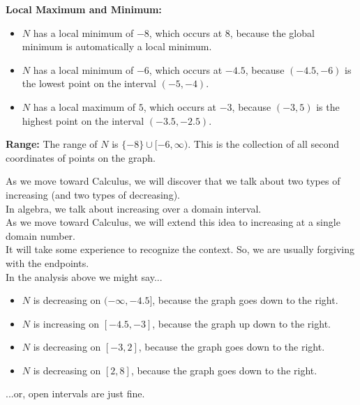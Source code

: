\documentclass{ximera}
\begin{document}
\begin{example}
\textbf{Local Maximum and Minimum:} 

\begin{itemize}
     \item $N$ has a local minimum of $-8$, which occurs at $8$, because the global minimum is automatically a local minimum.
     \item $N$ has a local minimum of $-6$, which occurs at $-4.5$, because $(-4.5, -6)$ is the lowest point on the interval $(-5, -4)$.
     \item $N$ has a local maximum of $5$, which occurs at $-3$, because $(-3, 5)$ is the highest point on the interval $(-3.5, -2.5)$.

\end{itemize}

\textbf{Range:} The range of $N$ is $\{ -8 \} \cup [-6, \infty)$. This is the collection of all second coordinates of points on the graph.\\ 


\end{example}



\begin{observation}

As we move toward Calculus, we will discover that we talk about two types of increasing (and two types of decreasing). \\

In algebra, we talk about increasing over a domain interval. \\

As we move toward Calculus, we will extend this idea to increasing at a single domain number. \\


It will take some experience to recognize the context.  So, we are usually forgiving with the endpoints. \\

In the analysis above we might say...


\begin{itemize}
     \item $N$ is decreasing on $(-\infty, -4.5]$, because the graph goes down to the right.
     \item $N$ is increasing on $[-4.5, -3]$, because the graph up down to the right.
     \item $N$ is decreasing on $[-3, 2]$, because the graph goes down to the right.
     \item $N$ is decreasing on $[2, 8]$, because the graph goes down to the right.
\end{itemize}


...or, open intervals are just fine.



\end{observation}
\end{document}
